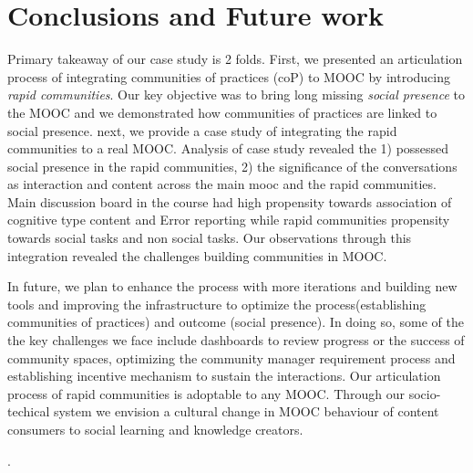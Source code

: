 \documentclass[manuscript,screen,review]{acmart}
\begin{document}
\section{Conclusions and Future work}
Primary takeaway of our case study is 2 folds. First, we presented an articulation process of integrating communities of practices (coP) to MOOC by introducing \textit{rapid communities}. Our key objective was to bring long missing \textit{social presence} to the MOOC and we demonstrated how communities of practices are linked to social presence. next, we provide a case study of integrating the rapid communities to a real MOOC. Analysis of case study revealed the 1) possessed social presence in the rapid communities, 2) the significance of the conversations as interaction and content across the main mooc and the rapid communities. Main discussion board in the course had high propensity towards association of cognitive type content and Error reporting while rapid communities propensity towards social tasks and non social tasks. Our observations through this integration revealed the challenges building communities in MOOC. 

In future, we plan to enhance the process with more iterations and building new tools and improving the infrastructure to optimize the process(establishing communities of practices) and outcome (social presence). In doing so, some of the the key challenges we face include dashboards to review progress or the success of community spaces, optimizing the community manager requirement process and establishing incentive mechanism to sustain the interactions. Our articulation process of rapid communities is adoptable to any MOOC. Through our socio-techical system we envision a cultural change in MOOC behaviour of content consumers to social learning and knowledge creators. 

.  










\end{document}
